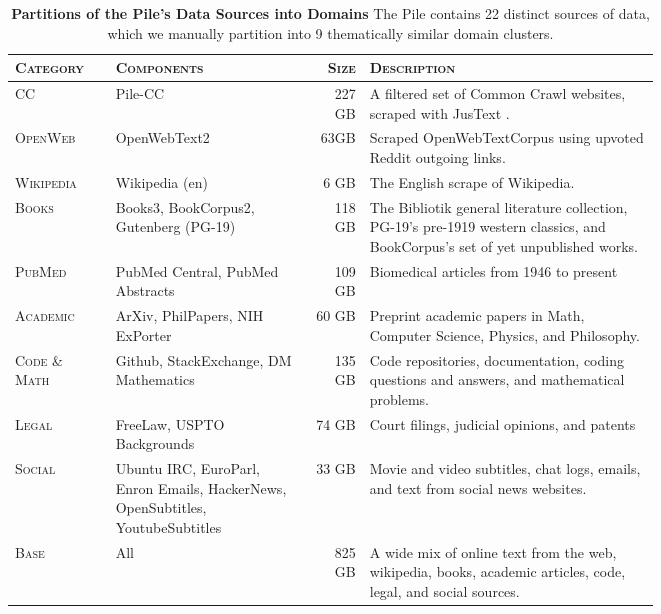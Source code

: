
\begingroup
\setlength{\tabcolsep}{4pt}
\begin{table*}[ht]
    \centering
    \small
    \caption{
    \textbf{Partitions of the Pile's Data Sources into Domains} The Pile contains 22 distinct sources of data, which we manually partition into 9 thematically similar domain clusters.}
    \begin{tabular}{l | p{0.3\linewidth} r p{0.45\linewidth}}
    \toprule
    \textsc{Category} & \textsc{Components} & \textsc{Size} & \textsc{Description} \\
    \midrule
    \textsc{CC} & Pile-CC & 227 GB & A filtered set of Common Crawl websites, scraped with JusText \citep{endredy2013more}. \\
    \textsc{OpenWeb} & OpenWebText2 & 63GB & Scraped OpenWebTextCorpus using upvoted Reddit outgoing links.\\
    \textsc{Wikipedia} & Wikipedia (en) & 6 GB & The English scrape of Wikipedia. \\
    \textsc{Books} & Books3, BookCorpus2, Gutenberg (PG-19) & 118 GB & The Bibliotik general literature collection, PG-19's pre-1919 western classics, and BookCorpus's set of yet unpublished works. \\
    \textsc{PubMed} & PubMed Central, PubMed Abstracts & 109 GB & Biomedical articles from 1946 to present \\
    \textsc{Academic} & ArXiv, PhilPapers, NIH ExPorter & 60 GB &  Preprint academic papers in Math, Computer Science, Physics, and Philosophy.\\
    \textsc{Code \& Math} & Github, StackExchange, DM Mathematics & 135 GB & Code repositories, documentation, coding questions and answers, and mathematical problems. \\
    \textsc{Legal} & FreeLaw, USPTO Backgrounds & 74 GB & Court filings, judicial opinions, and patents \\
    \textsc{Social} & Ubuntu IRC, EuroParl, Enron Emails, HackerNews, OpenSubtitles, YoutubeSubtitles & 33 GB & Movie and video subtitles, chat logs, emails, and text from social news websites. \\
    \midrule
    \textsc{Base} & All & 825 GB & A wide mix of online text from the web, wikipedia, books, academic articles, code, legal, and social sources. \\
    \bottomrule
    \end{tabular}
    \label{tab:pile-partitions}
\end{table*}
\endgroup
